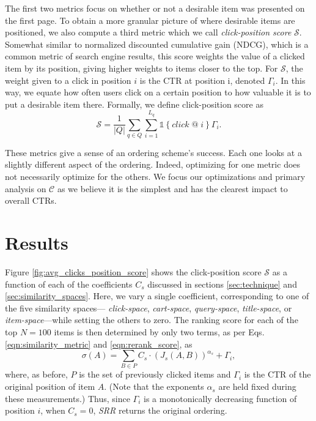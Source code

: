 \documentclass{article}
\begin{document}
The first two metrics focus on whether or not a desirable item was presented on the 
first page. To obtain a more granular picture of where desirable items are positioned, 
we also compute a third metric which we call {\em click-position score} $\mathscr{S}$. 
Somewhat similar to normalized discounted cumulative gain (NDCG), which is a common metric
of search engine results, this score weights the value of a clicked item by its position, 
giving higher weights to items closer to the top. For $\mathscr{S}$, the weight given to 
a click in position $i$ is the CTR at position i, denoted $\Gamma_i$. In this way, we equate how 
often users click on a certain position to how valuable it is to put a desirable 
item there. Formally, we define click-position score as
\begin{equation}
    \mathscr{S} = \frac{1}{\left\vert{Q}\right\vert}\sum_{q \in Q}\sum_{i=1}^{L_q}\mathds{1}\left\{click\; @\; i\right\}\Gamma_i.
\end{equation}

These metrics give a sense of an ordering scheme's success. Each one looks at a slightly 
different aspect of the ordering. Indeed, optimizing for one metric does not necessarily 
optimize for the others. We focus our optimizations and primary analysis on $\mathscr{C}$
as we believe it is the simplest and has the clearest impact to overall CTRs.

\section{Results}

Figure \ref{fig:avg_clicks_position_score} shows the click-position score $\mathscr{S}$ as a function of each of the coefficients $C_s$ discussed in
sections \ref{sec:technique} and \ref{sec:similarity_spaces}. Here, we vary a
single coefficient, corresponding to one of the five similarity spaces---{\em
click-space}, {\em cart-space}, {\em query-space}, {\em title-space}, or {\em
item-space}---while setting the others to zero. The ranking score for each of
the top $N=100$ items is then determined by only two terms, as per Eqs.
\ref{eqn:similarity_metric} and \ref{eqn:rerank_score}, as
\begin{equation}\label{eqn:single_coeff_score} 
    \sigma(A) = \sum_{B \in P}{C_s\cdot(J_s(A,B))^{\alpha_s}} + \Gamma_i, 
\end{equation}
where, as before, $P$ is the set of previously clicked items and $\Gamma_i$ is
the CTR of the original position of item $A$. (Note that the exponents
$\alpha_s$ are held fixed during these measurements.) Thus, since $\Gamma_i$ is
a monotonically decreasing function of position $i$, when $C_s = 0$, {\em SRR}
returns the original ordering.
\end{document}
